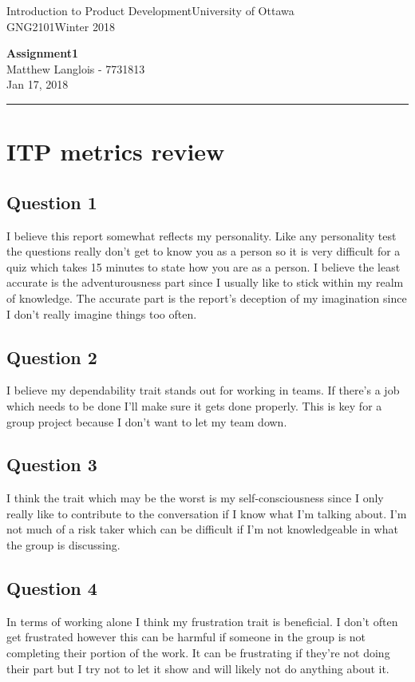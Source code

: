 \documentclass[fleqn, 12pt]{article}
\newcommand{\university}{University of Ottawa}
\newcommand{\name}{Matthew Langlois}
\newcommand{\studentNumber}{7731813}
\newcommand{\semester}{Winter 2018}
\newcommand{\assignmentType}{Assignment}
\newcommand{\assignmentNumber}{1}
\newcommand{\dueDate}{Jan 17, 2018}
\newcommand{\courseCode}{GNG2101}
\newcommand{\courseTitle}{Introduction to Product Development}
\newcommand{\essayTitle}{<Title>} %
\newcommand{\essaySubtitle}{<subtitle>} %
\newcommand{\essayAbstract}{} %
\newcommand{\beginassignemnt}{
    \newlength\tindent
    \setlength{\tindent}{\parindent}
    \setlength{\parindent}{0pt}

    \thispagestyle{assignment}
    \noindent
    \courseTitle \hfill \university\\
    \courseCode \hfill \semester
    \begin{center}
        \textbf{\assignmentType\text{ }\ifdefempty{\assignmentNumber}{}{\#}\assignmentNumber}\\
        \name \hspace{1pt} - \studentNumber\\
        \dueDate\\
    \end{center}
    \vspace{6pt}
    \hrule
    \vspace{1.5\headsep}
}
\newcommand{\beginessay}{
    \nocite{*}

    \pagestyle{frontmatter}
    \pagenumbering{roman}

    \begin{center}
        \normalsize
        \textsc{\university}\\[5cm]
        \LARGE \textbf{\MakeUppercase{\essayTitle}}\\[0.5cm]
        \large \text{ }\essaySubtitle\text{ }\\[10cm] %
        \normalsize
        \textsc{\name}\\
        \textsc{\studentNumber}\\
        \textsc{\courseCode}\\
        \textsc{\semester}\\
        \textsc{\dueDate}
    \end{center}
    \thispagestyle{empty}

    \newpage
    \tableofcontents
    \newpage

    \iftotalfigures
        \addcontentsline{toc}{section}{\listfigurename}
        \listoffigures
    \fi
    \iftotaltables
        \addcontentsline{toc}{section}{\listtablename}
        \listoftables
    \fi

    \ifdefempty{\essayAbstract}{}{
        \newpage
        \addcontentsline{toc}{section}{Abstract}
        \begin{abstract}
            \essayAbstract
        \end{abstract}

    }
    \label{EndFrontMatter}
    \newpage

    \pagenumbering{arabic}
    \pagestyle{body}
}
\begin{document}
\beginassignemnt


\section*{ITP metrics review}

\subsection*{Question 1}

I believe this report somewhat reflects my personality. Like any personality test the questions really don't get to know you as a person so it is very difficult for a quiz which takes 15 minutes to state how you are as a person. I believe the least accurate is the adventurousness part since I usually like to stick within my realm of knowledge. The accurate part is the report's deception of my imagination since I don't really imagine things too often.

\subsection*{Question 2}

I believe my dependability trait stands out for working in teams. If there's a job which needs to be done I'll make sure it gets done properly. This is key for a group project because I don't want to let my team down.

\subsection*{Question 3}

I think the trait which may be the worst is my self-consciousness since I only really like to contribute to the conversation if I know what I'm talking about. I'm not much of a risk taker which can be difficult if I'm not knowledgeable in what the group is discussing.

\subsection*{Question 4}

In terms of working alone I think my frustration trait is beneficial. I don't often get frustrated however this can be harmful if someone in the group is not completing their portion of the work. It can be frustrating if they're not doing their part but I try not to let it show and will likely not do anything about it.
\end{document}
